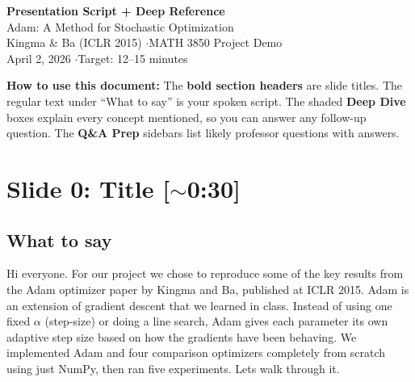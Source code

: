 \documentclass[11pt, letterpaper]{article}
\begin{document}
\begin{center}
{\LARGE\bfseries\color{warmaccent} Presentation Script + Deep Reference}\\[6pt]
{\large Adam: A Method for Stochastic Optimization}\\[4pt]
{\color{muted} Kingma \& Ba (ICLR 2015) \quad$\cdot$\quad MATH 3850 Project Demo}\\[4pt]
{\color{muted} April 2, 2026 \quad$\cdot$\quad Target: 12--15 minutes}
\end{center}

\vspace{4pt}
{\small\color{muted}\textbf{How to use this document:} The \textbf{bold section headers} are slide titles. The regular text under ``What to say'' is your spoken script. The shaded \colorbox{deepbg}{\textbf{Deep Dive}} boxes explain every concept mentioned, so you can answer any follow-up question. The {\color{rose}\textbf{Q\&A Prep}} sidebars list likely professor questions with answers.}

\vspace{8pt}

\section{Slide 0: Title \textnormal{\color{muted}[$\sim$0:30]}}

\subsection{What to say}

Hi everyone. For our project we chose to reproduce some of the key results from the Adam optimizer paper by Kingma and Ba, published at ICLR 2015. Adam is an extension of gradient descent that we learned in class. Instead of using one fixed $\alpha$ (step-size) or doing a line search, Adam gives each parameter its own adaptive step size based on how the gradients have been behaving. We implemented Adam and four comparison optimizers completely from scratch using just NumPy, then ran five experiments. Lets walk through it.
\end{document}
